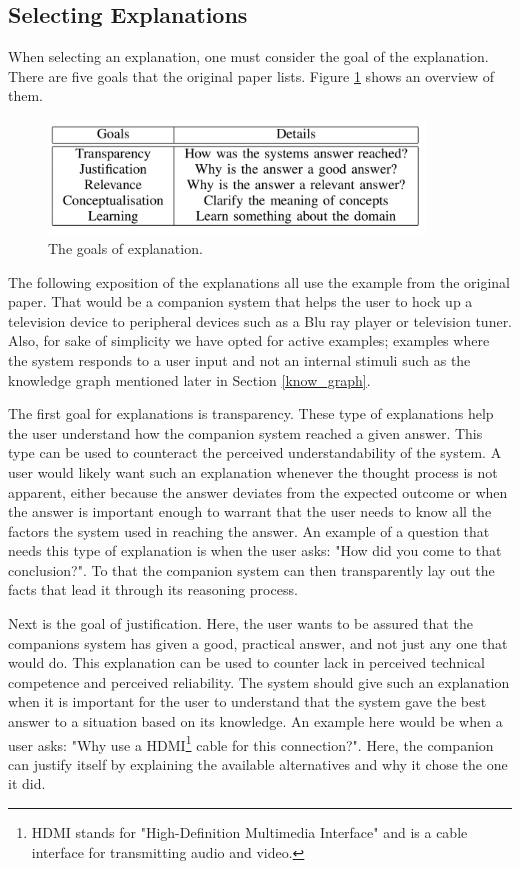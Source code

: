 \documentclass[a4paper]{article}
\begin{document}
\subsection{Selecting Explanations}

When selecting an explanation, one must consider the goal of the explanation. There are five goals that the original paper lists. Figure \ref{fig:goals} shows an overview of them.

\begin{figure}[H]
	\centering
	\includegraphics[width=10cm]{goals.png}
	\caption{The goals of explanation.}
	\label{fig:goals}
\end{figure}

The following exposition of the explanations all use the example from the original paper. That would be a companion system that helps the user to hock up a television device to peripheral devices such as a Blu ray player or television tuner. Also, for sake of simplicity we have opted for active examples; examples where the system responds to a user input and not an internal stimuli such as the knowledge graph mentioned later in Section \ref{know_graph}.

The first goal for explanations is transparency. These type of explanations help the user understand how the companion system reached a given answer. This type can be used to counteract the perceived understandability of the system. A user would likely want such an explanation whenever the thought process is not apparent, either because the answer deviates from the expected outcome or when the answer is important enough to warrant that the user needs to know all the factors the system used in reaching the answer. An example of a question that needs this type of explanation is when the user asks: "How did you come to that conclusion?". To that the companion system can then transparently lay out the facts that lead it through its reasoning process.

Next is the goal of justification. Here, the user wants to be assured that the companions system has given a good, practical answer, and not just any one that would do. This explanation can be used to counter lack in perceived technical competence and perceived reliability. The system should give such an explanation when it is important for the user to understand that the system gave the best answer to a situation based on its knowledge. An example here would be when a user asks: "Why use a HDMI\footnote{HDMI stands for "High-Definition Multimedia Interface" and is a cable interface for transmitting audio and video.} cable for this connection?". Here, the companion can justify itself by explaining the available alternatives and why it chose the one it did.
\end{document}
